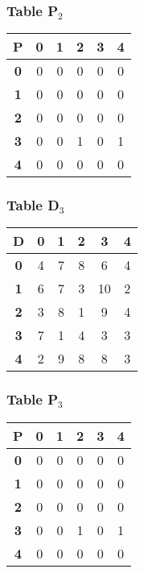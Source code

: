 \documentclass{beamer}
\begin{document}
\begin{frame}
\frametitle{Table P$_{2}$}
\begin{center}
    \begin{tabular}{|c||c|c|c|c|c|}
        \hline
        \textbf{P} & \textbf{0} & \textbf{1} & \textbf{2} & \textbf{3} & \textbf{4} \\
        \hline
        \hline
        \textbf{0}& 0 & 0 & 0 & 0 & 0 \\
        \hline
        \textbf{1}& 0 & 0 & 0 & 0 & 0 \\
        \hline
        \textbf{2}& 0 & 0 & 0 & 0 & 0 \\
        \hline
        \textbf{3}& 0 & 0 & \cellcolor{yellow}1 & 0 & \cellcolor{yellow}1 \\
        \hline
        \textbf{4}& 0 & 0 & 0 & 0 & 0 \\
        \hline
    \end{tabular}
\end{center}


\end{frame}


\begin{frame}
\frametitle{Table D$_{3}$}
\begin{center}
    \begin{tabular}{|c||c|c|c|c|c|}
        \hline
        \textbf{D} & \textbf{0} & \textbf{1} & \textbf{2} & \textbf{3} & \textbf{4} \\
        \hline
        \hline
        \textbf{0}& 4 & 7 & 8 & 6 & 4 \\
        \hline
        \textbf{1}& 6 & 7 & 3 & 10 & 2 \\
        \hline
        \textbf{2}& 3 & 8 & 1 & 9 & 4 \\
        \hline
        \textbf{3}& 7 & 1 & 4 & 3 & 3 \\
        \hline
        \textbf{4}& 2 & 9 & 8 & 8 & 3 \\
        \hline
    \end{tabular}
\end{center}


\end{frame}


\begin{frame}
\frametitle{Table P$_{3}$}
\begin{center}
    \begin{tabular}{|c||c|c|c|c|c|}
        \hline
        \textbf{P} & \textbf{0} & \textbf{1} & \textbf{2} & \textbf{3} & \textbf{4} \\
        \hline
        \hline
        \textbf{0}& 0 & 0 & 0 & 0 & 0 \\
        \hline
        \textbf{1}& 0 & 0 & 0 & 0 & 0 \\
        \hline
        \textbf{2}& 0 & 0 & 0 & 0 & 0 \\
        \hline
        \textbf{3}& 0 & 0 & 1 & 0 & 1 \\
        \hline
        \textbf{4}& 0 & 0 & 0 & 0 & 0 \\
        \hline
    \end{tabular}
\end{center}


\end{frame}
\end{document}
